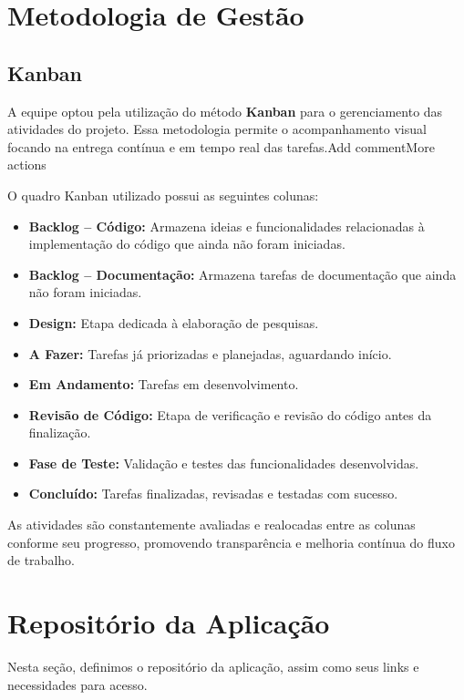 \documentclass[
	12pt,				%
	openany,			%
	twoside,			%
	a4paper,			%
	english,			%
	brazil				%
	]{abntex2}
\begin{document}
\section{Metodologia de Gestão}

\subsection{Kanban}

A equipe optou pela utilização do método \textbf{Kanban} para o gerenciamento das atividades do projeto. Essa metodologia permite o acompanhamento visual focando na entrega contínua e em tempo real das tarefas.Add commentMore actions

O quadro Kanban utilizado possui as seguintes colunas:

\begin{itemize}
    \item \textbf{Backlog – Código:} Armazena ideias e funcionalidades relacionadas à implementação do código que ainda não foram iniciadas.
    \item \textbf{Backlog – Documentação:} Armazena tarefas de documentação que ainda não foram iniciadas.
    \item \textbf{Design:} Etapa dedicada à elaboração de pesquisas.
    \item \textbf{A Fazer:} Tarefas já priorizadas e planejadas, aguardando início.
    \item \textbf{Em Andamento:} Tarefas em desenvolvimento.
    \item \textbf{Revisão de Código:} Etapa de verificação e revisão do código antes da finalização.
    \item \textbf{Fase de Teste:} Validação e testes das funcionalidades desenvolvidas.
    \item \textbf{Concluído:} Tarefas finalizadas, revisadas e testadas com sucesso.
\end{itemize}

As atividades são constantemente avaliadas e realocadas entre as colunas conforme seu progresso, promovendo transparência e melhoria contínua do fluxo de trabalho.

\section{Repositório da Aplicação}

Nesta seção, definimos o repositório da aplicação, assim como seus links e necessidades para acesso.
\end{document}
